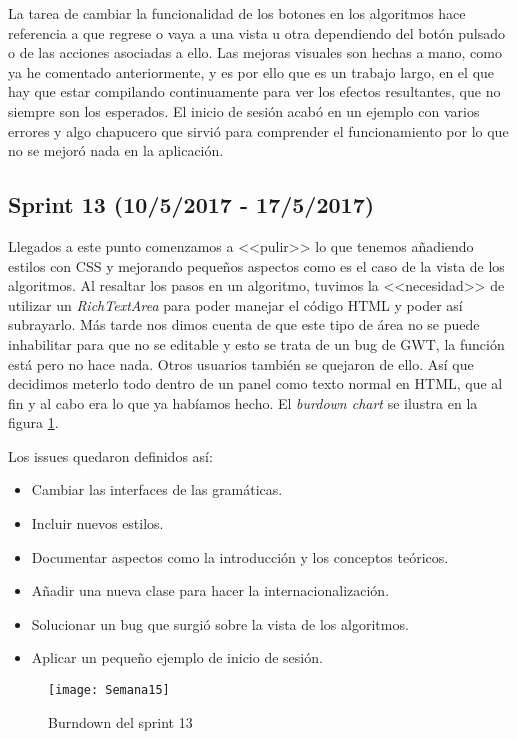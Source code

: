 La tarea de cambiar la funcionalidad de los botones en los algoritmos hace referencia a que regrese o vaya a una vista u otra dependiendo del botón pulsado o de las acciones asociadas a ello.
Las mejoras visuales son hechas a mano, como ya he comentado anteriormente, y es por ello que es un trabajo largo, en el que hay que estar compilando continuamente para ver los efectos resultantes, que no siempre son los esperados.
El inicio de sesión acabó en un ejemplo con varios errores y algo chapucero que sirvió para comprender el funcionamiento por lo que no se mejoró nada en la aplicación.

\subsection{Sprint 13 (10/5/2017 - 17/5/2017)}

Llegados a este punto comenzamos a <<pulir>> lo que tenemos añadiendo estilos con CSS y mejorando pequeños aspectos como es el caso de la vista de los algoritmos. Al resaltar los pasos en un algoritmo, tuvimos la <<necesidad>> de utilizar un \emph{RichTextArea} para poder manejar el código HTML y poder así subrayarlo. Más tarde nos dimos cuenta de que este tipo de área no se puede inhabilitar para que no se editable y esto se trata de un bug de GWT, la función está pero no hace nada. Otros usuarios también se quejaron de ello. Así que decidimos meterlo todo dentro de un panel como texto normal en HTML, que al fin y al cabo era lo que ya habíamos hecho. El \emph{burdown chart} se ilustra en la figura \ref{fig:A.12}.

Los issues quedaron definidos así:
\begin{itemize}
\item Cambiar las interfaces de las gramáticas.
\item Incluir nuevos estilos.
\item Documentar aspectos como la introducción y los conceptos teóricos.
\item Añadir una nueva clase para hacer la internacionalización.
\item Solucionar un bug que surgió sobre la vista de los algoritmos.
\item Aplicar un pequeño ejemplo de inicio de sesión.
\end{itemize}

\begin{figure}[h]
\centering
\texttt{[image: Semana15]}
\caption{Burndown del sprint 13}
\label{fig:A.12}
\end{figure}

